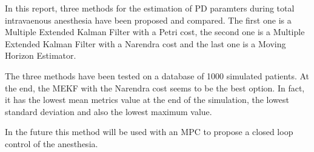 
In this report, three methods for the estimation of PD paramters during total intravaenous anesthesia have been proposed and compared. The first one is a Multiple Extended Kalman Filter with a Petri cost, the second one is a Multiple Extended Kalman Filter with a Narendra cost and the last one is a Moving Horizon Estimator. \medskip

The three methods have been tested on a database of 1000 simulated patients. At the end, the MEKF with the Narendra cost seems to be the best option. In fact, it has the lowest mean metrics value at the end of the simulation, the lowest standard deviation and also the lowest maximum value.\medskip

In the future this method will be used with an MPC to propose a closed loop control of the anesthesia. \medskip
